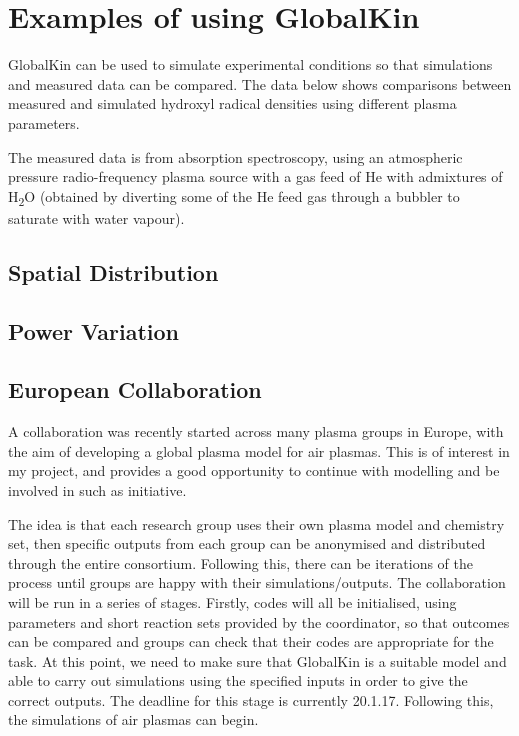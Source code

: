\documentclass[11pt, oneside]{article}   	%
\begin{document}
\section{Examples of using GlobalKin}
GlobalKin can be used to simulate experimental conditions so that simulations and measured data can be compared.
The data below shows comparisons between measured and simulated hydroxyl radical densities using different plasma parameters.

The measured data is from absorption spectroscopy, using an atmospheric pressure radio-frequency plasma source with a gas feed of He with admixtures of H\textsubscript{2}O (obtained by diverting some of the He feed gas through a bubbler to saturate with water vapour).

\subsection{Spatial Distribution}

\subsection{Power Variation}


\subsection{European Collaboration}
A collaboration was recently started across many plasma groups in Europe, with the aim of developing a global plasma model for air plasmas.
This is of interest in my project, and provides a good opportunity to continue with modelling and be involved in such as initiative.

The idea is that each research group uses their own plasma model and chemistry set, then specific outputs from each group can be anonymised and distributed through the entire consortium.
Following this, there can be iterations of the process until groups are happy with their simulations/outputs.
The collaboration will be run in a series of stages.
Firstly, codes will all be initialised, using parameters and short reaction sets provided by the coordinator, so that outcomes can be compared and groups can check that their codes are appropriate for the task.
At this point, we need to make sure that GlobalKin is a suitable model and able to carry out simulations using the specified inputs in order to give the correct outputs.
The deadline for this stage is currently 20.1.17.
Following this, the simulations of air plasmas can begin.
\end{document}
